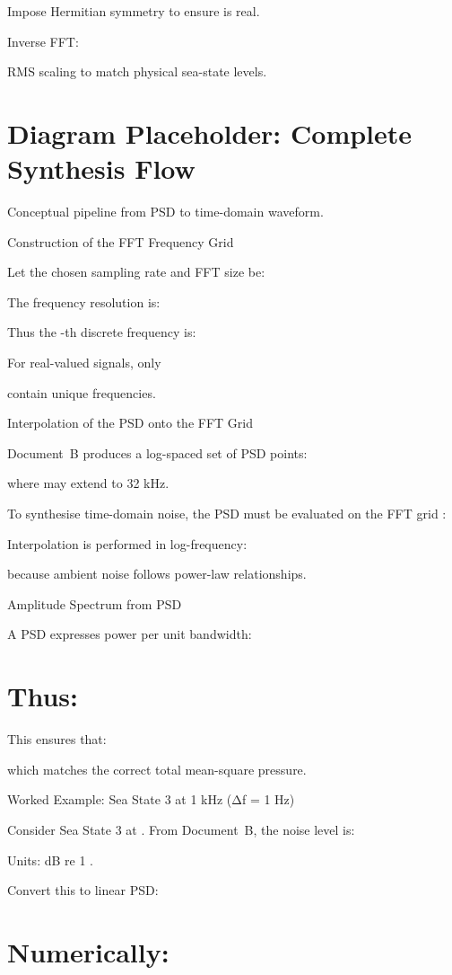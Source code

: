 \documentclass[12pt]{article}
\begin{document}
Impose Hermitian symmetry to ensure  is real.

Inverse FFT:


RMS scaling to match physical sea-state levels.

\section*{Diagram Placeholder: Complete Synthesis Flow}
Conceptual pipeline from PSD to time-domain waveform.

Construction of the FFT Frequency Grid

Let the chosen sampling rate and FFT size be:


The frequency resolution is:


Thus the -th discrete frequency is:


For real-valued signals, only


contain unique frequencies.

Interpolation of the PSD onto the FFT Grid

Document B produces a log-spaced set of PSD points:


where  may extend to 32 kHz.

To synthesise time-domain noise, the PSD must be evaluated on the FFT grid :


Interpolation is performed in log-frequency:


because ambient noise follows power-law relationships.

Amplitude Spectrum from PSD

A PSD expresses power per unit bandwidth:


\section*{Thus:}

This ensures that:


which matches the correct total mean-square pressure.

Worked Example: Sea State 3 at 1 kHz (Δf = 1 Hz)

Consider Sea State 3 at . From Document B, the noise level is:


Units: dB re 1 .

Convert this to linear PSD:


\section*{Numerically:}
\end{document}
